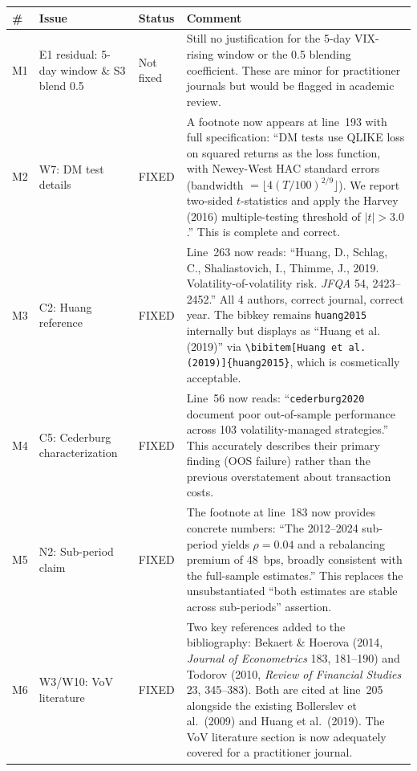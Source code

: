 \documentclass[12pt,a4paper]{article}
\begin{document}
\begin{longtable}{p{0.6cm}p{2.5cm}p{2cm}p{8cm}}
\toprule
\# & Issue & Status & Comment \\
\midrule
M1 & E1 residual: 5-day window \& S3 blend 0.5 & \textcolor{warncolor}{Not fixed} & Still no justification for the 5-day VIX-rising window or the 0.5 blending coefficient. These are minor for practitioner journals but would be flagged in academic review. \\
\midrule
M2 & W7: DM test details & \textcolor{okgreen}{FIXED} & A footnote now appears at line~193 with full specification: ``DM tests use QLIKE loss on squared returns as the loss function, with Newey-West HAC standard errors (bandwidth $= \lfloor 4(T/100)^{2/9} \rfloor$). We report two-sided $t$-statistics and apply the Harvey (2016) multiple-testing threshold of $|t| > 3.0$.'' This is complete and correct. \\
\midrule
M3 & C2: Huang reference & \textcolor{okgreen}{FIXED} & Line~263 now reads: ``Huang, D., Schlag, C., Shaliastovich, I., Thimme, J., 2019. Volatility-of-volatility risk. \textit{JFQA} 54, 2423--2452.'' All 4 authors, correct journal, correct year. The bibkey remains \texttt{huang2015} internally but displays as ``Huang et al. (2019)'' via \texttt{\textbackslash bibitem[Huang et al.(2019)]\{huang2015\}}, which is cosmetically acceptable. \\
\midrule
M4 & C5: Cederburg characterization & \textcolor{okgreen}{FIXED} & Line~56 now reads: ``\texttt{cederburg2020} document poor out-of-sample performance across 103 volatility-managed strategies.'' This accurately describes their primary finding (OOS failure) rather than the previous overstatement about transaction costs. \\
\midrule
M5 & N2: Sub-period claim & \textcolor{okgreen}{FIXED} & The footnote at line~183 now provides concrete numbers: ``The 2012--2024 sub-period yields $\rho = 0.04$ and a rebalancing premium of 48~bps, broadly consistent with the full-sample estimates.'' This replaces the unsubstantiated ``both estimates are stable across sub-periods'' assertion. \\
\midrule
M6 & W3/W10: VoV literature & \textcolor{okgreen}{FIXED} & Two key references added to the bibliography: Bekaert \& Hoerova (2014, \textit{Journal of Econometrics} 183, 181--190) and Todorov (2010, \textit{Review of Financial Studies} 23, 345--383). Both are cited at line~205 alongside the existing Bollerslev et al.\ (2009) and Huang et al.\ (2019). The VoV literature section is now adequately covered for a practitioner journal. \\
\bottomrule
\end{longtable}
\end{document}
